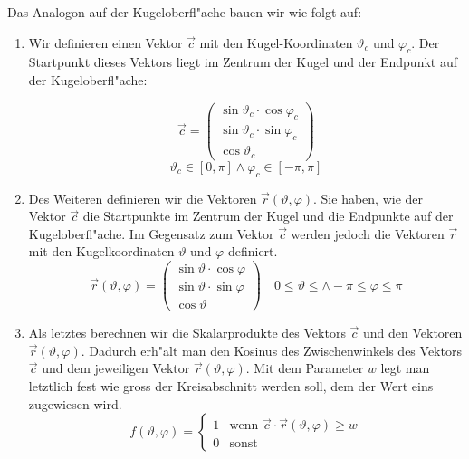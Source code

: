 \begin{refsection}
Das Analogon auf der Kugeloberfl"ache bauen wir wie folgt auf:
\begin{enumerate}
\item Wir definieren einen Vektor $\vec{c}$ mit den Kugel-Koordinaten
$\vartheta_c$ und $\varphi_c$.
Der Startpunkt dieses Vektors liegt im Zentrum der Kugel und der
Endpunkt auf der Kugeloberfl"ache:

\begin{equation}
\vec{c} = 
\begin{pmatrix}
{\sin\vartheta_c \cdot \cos\varphi_c}\\
{\sin\vartheta_c \cdot \sin\varphi_c}\\
{\cos\vartheta_c}
\end{pmatrix}
\label{skript:Vektor c Formel}
\end{equation}
$$
\vartheta_c \in [ 0, \pi ] \wedge \varphi_c \in [ -\pi, \pi ]
$$

\item Des Weiteren definieren wir die Vektoren $\vec{r} (\vartheta, 
\varphi)$.
Sie haben, wie der Vektor $\vec{c}$ die Startpunkte im Zentrum der 
Kugel und die Endpunkte auf der Kugeloberfl"ache. 
Im Gegensatz zum Vektor $\vec{c}$ werden jedoch die Vektoren  
$\vec{r}$ mit den Kugelkoordinaten $\vartheta$ und $\varphi$ 
definiert.
\[
\vec{r} (\vartheta, \varphi) = 
\begin{pmatrix}
{\sin\vartheta \cdot \cos\varphi}\\
{\sin\vartheta \cdot \sin\varphi}\\
{\cos\vartheta}
\end{pmatrix}
\quad
0 \leq \vartheta \leq \wedge -\pi \leq \varphi \leq \pi
\]

\item Als letztes berechnen wir die Skalarprodukte des Vektors $\vec{c}$
und den Vektoren $\vec{r} (\vartheta, \varphi)$.
Dadurch erh"alt man den Kosinus des Zwischenwinkels des Vektors $\vec{c}$
und dem jeweiligen Vektor $\vec{r} (\vartheta, \varphi)$.
Mit dem Parameter $w$ legt man letztlich fest wie gross der 
Kreisabschnitt werden soll, dem der Wert eins zugewiesen wird.
\begin{equation}
f(\vartheta, \varphi) =\begin{cases}
1 & \text{wenn } \vec{c} \cdot \vec{r} (\vartheta, \varphi) \geq w\\
0 & \text{sonst}
\end{cases}
\label{skript:Kugelfunktion Formel}
\end{equation}
\end{enumerate}

\end{refsection}
